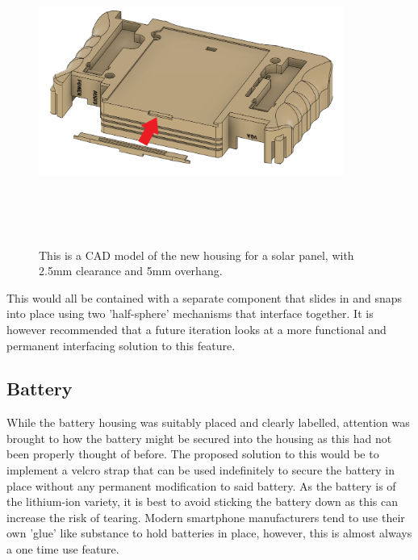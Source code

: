\begin{figure} [h]
    \centering
    \includegraphics[width=10cm,height=10cm,keepaspectratio]{Figures/solar_new.png}
    \caption{This is a CAD model of the new housing for a solar panel, with 2.5mm clearance and 5mm overhang.}
    \label{fig:NewSolar}
    \end{figure}

This would all be contained with a separate component that slides in and snaps into place using two 'half-sphere' mechanisms that interface together.
It is however recommended that a future iteration looks at a more functional and permanent interfacing solution to this feature.

\subsection{Battery}

While the battery housing was suitably placed and clearly labelled, attention was brought to how the battery might be secured into the housing as this had not been properly thought of before.
The proposed solution to this would be to implement a velcro strap that can be used indefinitely to secure the battery in place without any permanent modification to said battery.
As the battery is of the lithium-ion variety, it is best to avoid sticking the battery down as this can increase the risk of tearing.
Modern smartphone manufacturers tend to use their own 'glue' like substance to hold batteries in place, however, this is almost always a one time use feature.

